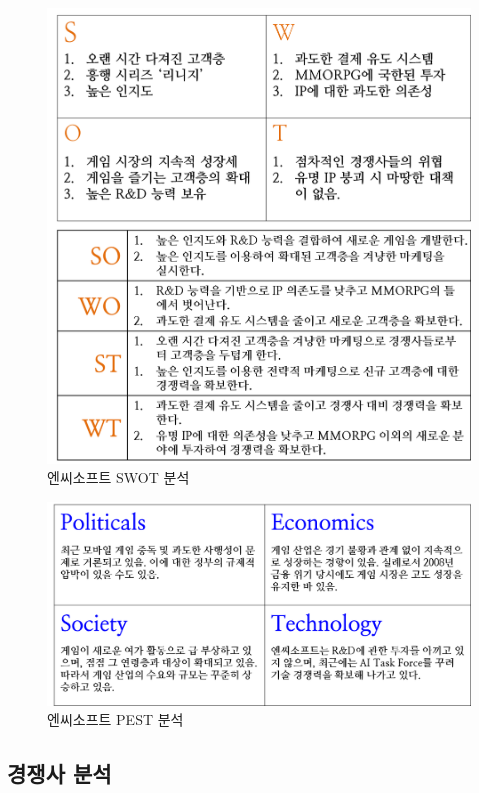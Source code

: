 \documentclass[11pt]{oblivoir}
\begin{document}
		\begin{figure}[htbp]
			\centering
			\includegraphics[width=1\textwidth]{Pictures/SWOT.png}
			\caption{엔씨소프트 SWOT 분석}
		\end{figure}
	
		\begin{figure}[htbp]
			\centering
			\includegraphics[width=1\textwidth]{Pictures/PEST.png}
			\caption{엔씨소프트 PEST 분석}
		\end{figure}
	
		\subsection{경쟁사 분석}
		
\end{document}
